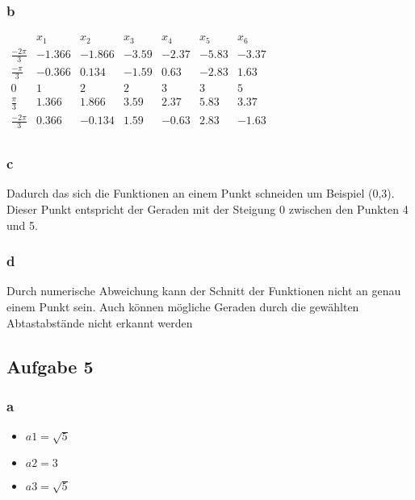 \documentclass{article}
\begin{document}
		\subsubsection{b}
	
		$ \begin{matrix}
			& x_1 & x_2 & x_3 & x_4 & x_5 & x_6 \\
			\frac{-2\pi}{3} &-1.366 & -1.866 & -3.59 & -2.37 & -5.83 & -3.37 \\
			\frac{-\pi}{3}&-0.366 & 0.134 & -1.59 & 0.63 & -2.83 & 1.63 \\
			0&1 & 2 & 2 & 3 & 3 & 5 \\
			\frac{\pi}{3}&1.366 & 1.866 & 3.59 & 2.37 & 5.83 & 3.37 \\
			\frac{-2\pi}{3} &0.366 & -0.134 & 1.59 & -0.63 & 2.83 & -1.63 \\
				
		\end{matrix}$
		
		\subsubsection{c}
		 Dadurch das sich die Funktionen an einem Punkt schneiden um Beispiel (0,3). Dieser Punkt entspricht der Geraden mit der Steigung 0 zwischen den Punkten 4 und 5. 
		 		
		\subsubsection{d}
		Durch numerische Abweichung kann der Schnitt der Funktionen nicht an genau einem Punkt sein. Auch können mögliche Geraden durch die gewählten Abtastabstände nicht erkannt werden

\subsection{Aufgabe 5}

	\subsubsection{a}
		\begin{itemize}
			\item $a1 = \sqrt{5}$
			\item $a2 = 3$
			\item $a3 = \sqrt{5}$
		\end{itemize}
	
\end{document}
